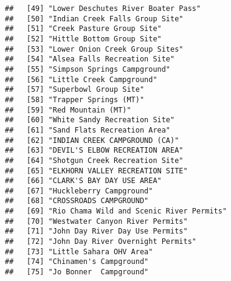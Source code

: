 \documentclass[
]{article}
\begin{document}
\begin{verbatim}
##   [49] "Lower Deschutes River Boater Pass"                                                   
##   [50] "Indian Creek Falls Group Site"                                                       
##   [51] "Creek Pasture Group Site"                                                            
##   [52] "Hittle Bottom Group Site"                                                            
##   [53] "Lower Onion Creek Group Sites"                                                       
##   [54] "Alsea Falls Recreation Site"                                                         
##   [55] "Simpson Springs Campground"                                                          
##   [56] "Little Creek Campground"                                                             
##   [57] "Superbowl Group Site"                                                                
##   [58] "Trapper Springs (MT)"                                                                
##   [59] "Red Mountain (MT)"                                                                   
##   [60] "White Sandy Recreation Site"                                                         
##   [61] "Sand Flats Recreation Area"                                                          
##   [62] "INDIAN CREEK CAMPGROUND (CA)"                                                        
##   [63] "DEVIL'S ELBOW RECREATION AREA"                                                       
##   [64] "Shotgun Creek Recreation Site"                                                       
##   [65] "ELKHORN VALLEY RECREATION SITE"                                                      
##   [66] "CLARK'S BAY DAY USE AREA"                                                            
##   [67] "Huckleberry Campground"                                                              
##   [68] "CROSSROADS CAMPGROUND"                                                               
##   [69] "Rio Chama Wild and Scenic River Permits"                                             
##   [70] "Westwater Canyon River Permits"                                                      
##   [71] "John Day River Day Use Permits"                                                      
##   [72] "John Day River Overnight Permits"                                                    
##   [73] "Little Sahara OHV Area"                                                              
##   [74] "Chinamen's Campground"                                                               
##   [75] "Jo Bonner  Campground"                                                               

\end{verbatim}
\end{document}
